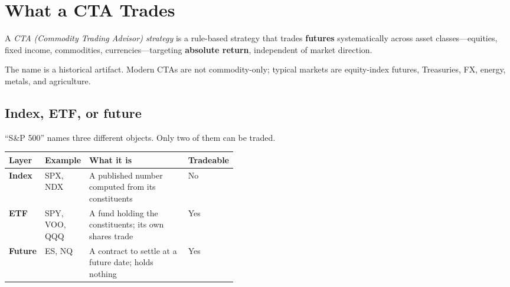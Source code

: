 


\section{What a CTA Trades}\label{sec:what-a-cta-trades}

\begin{definition}\label{def:cta}
A \emph{CTA (Commodity Trading Advisor) strategy} is a rule-based strategy that trades
\textbf{futures} systematically across asset classes---equities, fixed income, commodities,
currencies---targeting \textbf{absolute return}, independent of market direction.
\end{definition}

\begin{note}
The name is a historical artifact. Modern CTAs are not commodity-only; typical markets are
equity-index futures, Treasuries, FX, energy, metals, and agriculture.
\end{note}

\subsection{Index, ETF, or future}\label{sec:index-etf-future}

``S\&P 500'' names three different objects. Only two of them can be traded.

\begin{tabularx}{\linewidth}{|>{\raggedright\arraybackslash}p{0.14\linewidth}|>{\raggedright\arraybackslash}p{0.18\linewidth}|X|>{\raggedright\arraybackslash}p{0.13\linewidth}|}
\hline
\textbf{Layer} & \textbf{Example} & \textbf{What it is} & \textbf{Tradeable} \\ \hline
\textbf{Index}  & SPX, NDX      & A published number computed from its constituents & No  \\ \hline
\textbf{ETF}    & SPY, VOO, QQQ & A fund holding the constituents; its own shares trade & Yes \\ \hline
\textbf{Future} & ES, NQ        & A contract to settle at a future date; holds nothing & Yes \\ \hline
\end{tabularx}

